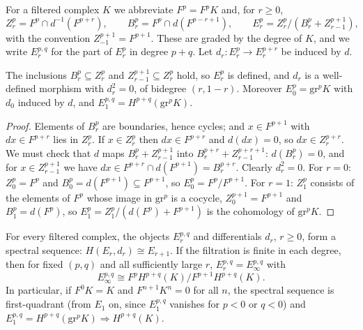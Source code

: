 \begin{definition}\label{spectral-sequences:definition-z-b}
For a filtered complex $K$ we abbreviate $F^p = F^pK$ and, for $r \geq 0$,
\[
Z_r^p = F^p \cap d^{-1}(F^{p+r}), \qquad B_r^p = F^p \cap d(F^{p-r+1}), \qquad
E_r^p = Z_r^p/(B_r^p + Z_{r-1}^{p+1}),
\]
with the convention $Z_{-1}^{p+1} = F^{p+1}$. These are graded by the degree of $K$, and we write $E_r^{p,q}$ for the part of $E_r^p$ in
degree $p + q$. Let $d_r \colon E_r^p \to E_r^{p+r}$ be induced by $d$.
\end{definition}

\begin{lemma}\label{spectral-sequences:lemma-well-defined}
The inclusions $B_r^p \subseteq Z_r^p$ and $Z_{r-1}^{p+1} \subseteq Z_r^p$ hold, so $E_r^p$ is defined, and $d_r$ is a well-defined
morphism with $d_r^2 = 0$, of bidegree $(r, 1 - r)$. Moreover $E_0^p = \mathrm{gr}^pK$ with $d_0$ induced by $d$, and
$E_1^{p,q} = H^{p+q}(\mathrm{gr}^pK)$.
\end{lemma}

\begin{proof}
Elements of $B_r^p$ are boundaries, hence cycles; and $x \in F^{p+1}$ with $dx \in F^{p+r}$ lies in $Z_r^p$. If $x \in Z_r^p$ then
$dx \in F^{p+r}$ and $d(dx) = 0$, so $dx \in Z_r^{p+r}$. We must check that $d$ maps $B_r^p + Z_{r-1}^{p+1}$ into
$B_r^{p+r} + Z_{r-1}^{p+r+1}$: $d(B_r^p) = 0$, and for $x \in Z_{r-1}^{p+1}$ we have $dx \in F^{p+r} \cap d(F^{p+1}) = B_r^{p+r}$.
Clearly $d_r^2 = 0$. For $r = 0$: $Z_0^p = F^p$ and $B_0^p = d(F^{p+1}) \subseteq F^{p+1}$, so $E_0^p = F^p/F^{p+1}$. For $r = 1$:
$Z_1^p$ consists of the elements of $F^p$ whose image in $\mathrm{gr}^p$ is a cocycle, $Z_0^{p+1} = F^{p+1}$ and $B_1^p = d(F^p)$, so
$E_1^p = Z_1^p/(d(F^p) + F^{p+1})$ is the cohomology of $\mathrm{gr}^pK$.
\end{proof}

\begin{theorem}\label{spectral-sequences:theorem-filtered-complex}
For every filtered complex, the objects $E_r^{p,q}$ and differentials $d_r$, $r \geq 0$, form a spectral sequence:
$H(E_r, d_r) \cong E_{r+1}$. If the filtration is finite in each degree, then for fixed $(p, q)$ and all sufficiently large $r$,
$E_r^{p,q} = E_\infty^{p,q}$ with
\[
E_\infty^{p,q} \cong F^pH^{p+q}(K)/F^{p+1}H^{p+q}(K).
\]
In particular, if $F^0K = K$ and $F^{n+1}K^n = 0$ for all $n$, the spectral sequence is first-quadrant (from $E_1$ on, since
$E_1^{p,q}$ vanishes for $p < 0$ or $q < 0$) and $E_1^{p,q} = H^{p+q}(\mathrm{gr}^pK) \Rightarrow H^{p+q}(K)$.
\end{theorem}

